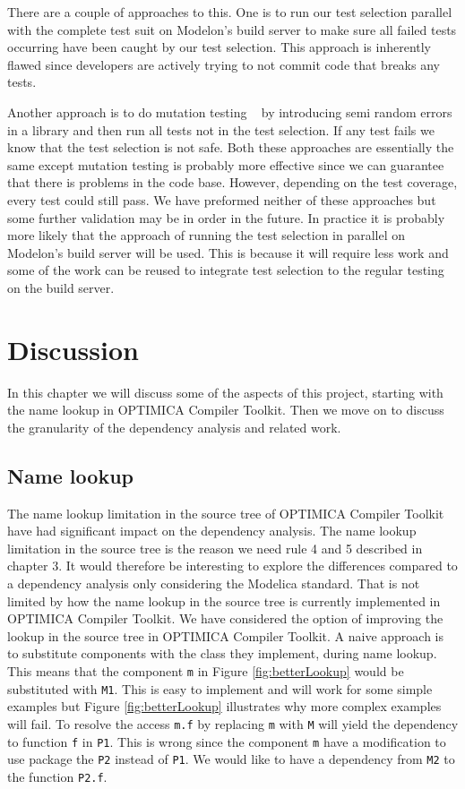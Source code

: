 \documentclass{cslthse-msc}
\begin{document}
There are a couple of approaches to this. One is to run our test selection parallel with the complete test suit on Modelon's build server to make sure all failed tests occurring have been caught by our test selection. This approach is inherently flawed since developers are actively trying to not commit code that breaks any tests.

Another approach is to do mutation testing ~\cite{DBLP:journals/tse/JiaH11} by introducing semi random errors in a library and then run all tests not in the test selection. If any test fails we know that the test selection is not safe. Both these approaches are essentially the same except mutation testing is probably more effective since we can guarantee that there is problems in the code base. However, depending on the test coverage, every test could still pass. We have preformed neither of these approaches but some further validation may be in order in the future. In practice it is probably more likely that the approach of running the test selection in parallel on Modelon's build server will be used. This is because it will require less work and some of the work can be reused to integrate test selection to the regular testing on the build server. 

\chapter[Discussion]{Discussion}

In this chapter we will discuss some of the aspects of this project, starting with the name lookup in OPTIMICA Compiler Toolkit. Then we move on to discuss the granularity of the dependency analysis and related work. 

\section{Name lookup}
The name lookup limitation in the source tree of OPTIMICA Compiler Toolkit have had significant impact on the dependency analysis. The name lookup limitation in the source tree is the reason we need rule 4 and 5 described in chapter 3. It would therefore be interesting to explore the differences compared to a dependency analysis only considering the Modelica standard. That is not limited by how the name lookup in the source tree is currently implemented in OPTIMICA Compiler Toolkit. We have considered the option of improving the lookup in the source tree in OPTIMICA Compiler Toolkit. A naive approach is to substitute components with the class they implement, during name lookup. This means that the component \texttt{m} in Figure \ref{fig:betterLookup} would be substituted with \texttt{M1}. This is easy to implement and will work for some simple examples but Figure \ref{fig:betterLookup} illustrates why more complex examples will fail. To resolve the access \texttt{m.f} by replacing \texttt{m} with \texttt{M} will yield the dependency to function \texttt{f} in \texttt{P1}. This is wrong since the component \texttt{m} have a modification to use package the \texttt{P2} instead of \texttt{P1}. We would like to have a dependency from \texttt{M2} to the function \texttt{P2.f}.
\end{document}
